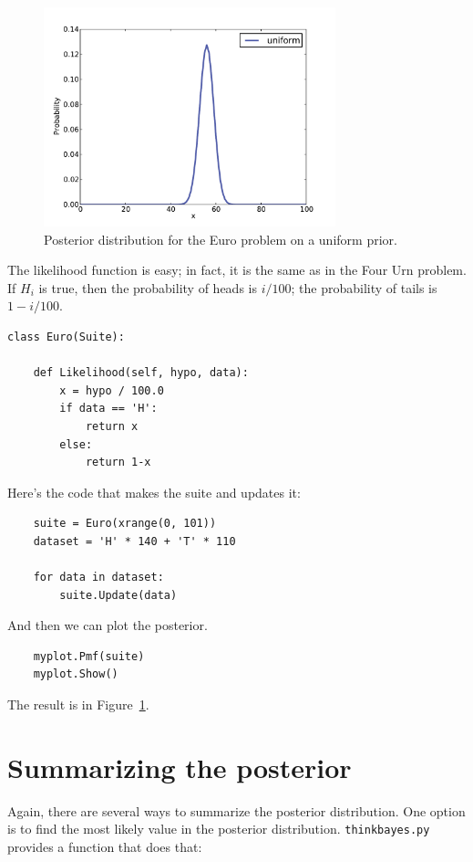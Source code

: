 \documentclass[12pt]{book}
\begin{document}
\begin{figure}
\centerline{\includegraphics[height=2.5in]{figs/euro1.pdf}}
\caption{Posterior distribution for the Euro problem
on a uniform prior.}
\label{fig.euro1}
\end{figure}

The likelihood function is easy; in fact, it is the same as in
the Four Urn problem.  If $H_i$ is true, then the probability of
heads is $i/100$; the probability of tails is $1- i/100$.

\begin{verbatim}
class Euro(Suite):

    def Likelihood(self, hypo, data):
        x = hypo / 100.0
        if data == 'H':
            return x
        else:
            return 1-x
\end{verbatim}

Here's the code that makes the suite and updates it:

\begin{verbatim}
    suite = Euro(xrange(0, 101))
    dataset = 'H' * 140 + 'T' * 110

    for data in dataset:
        suite.Update(data)
\end{verbatim}

And then we can plot the posterior.

\begin{verbatim}
    myplot.Pmf(suite)
    myplot.Show()
\end{verbatim}

The result is in Figure~\ref{fig.euro1}.


\section{Summarizing the posterior}

Again, there are several ways to summarize the posterior distribution.
One option is to find the most likely value in the posterior
distribution.  \verb"thinkbayes.py" provides a function that does 
that:
\end{document}
